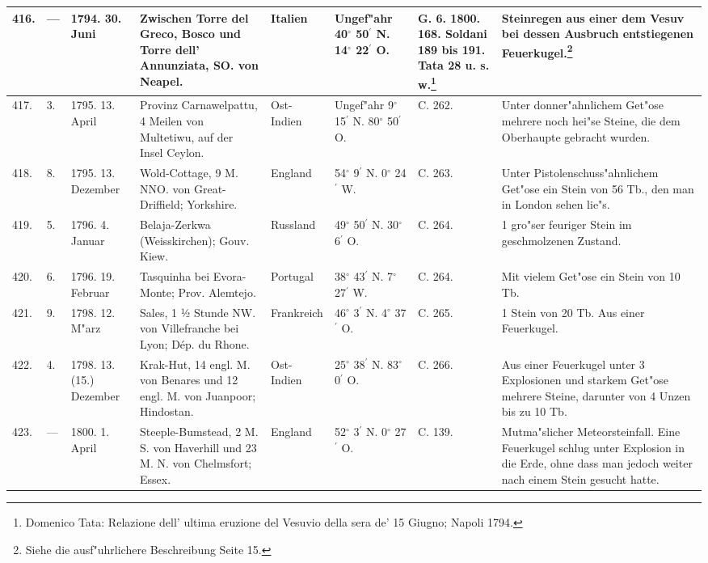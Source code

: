 \documentclass[a4paper, 8pt, oneside, polutonikogreek, german]{article}
\begin{document}
\begin{center}
\begin{longtable}{| p{4mm} | p{2mm} | p{15mm} | p{25mm} | p{16mm} | p{12mm} | p{13mm} | p{20mm} |}
        416. & --- & 1794. 30. Juni & Zwischen Torre del Greco, Bosco und Torre dell’ Annunziata, SO. von Neapel. & Italien & Ungef"ahr 40$^\circ$ 50$^\prime$ N. 14$^\circ$ 22$^\prime$ O. & G. 6. 1800. 168. Soldani 189 bis 191. Tata 28 u. s. w.\footnote{Domenico Tata: Relazione dell' ultima eruzione del Vesuvio della sera de' 15 Giugno; Napoli 1794.} & Steinregen aus einer dem Vesuv bei dessen Ausbruch entstiegenen Feuerkugel.\footnote{Siehe die ausf"uhrlichere Beschreibung Seite 15.} \\ \hline
        417. & 3. & 1795. 13. April & Provinz Carnawelpattu, 4 Meilen von Multetiwu, auf der Insel Ceylon. & Ost-Indien & Ungef"ahr 9$^\circ$ 15$^\prime$ N. 80$^\circ$ 50$^\prime$ O. & C. 262. & Unter donner"ahnlichem Get"ose mehrere noch hei"se Steine, die dem Oberhaupte gebracht wurden. \\ \hline
        418. & 8. & 1795. 13. Dezember & Wold-Cottage, 9 M. NNO. von Great-Driffield; Yorkshire. & England & 54$^\circ$ 9$^\prime$ N. 0$^\circ$ 24$^\prime$ W. & C. 263. & Unter Pistolenschuss"ahnlichem Get"ose ein Stein von 56 Tb., den man in London sehen lie"s. \\ \hline
        419. & 5. & 1796. 4. Januar & Belaja-Zerkwa (Weisskirchen); Gouv. Kiew. & Russland & 49$^\circ$ 50$^\prime$ N. 30$^\circ$ 6$^\prime$ O. & C. 264. & 1 gro"ser feuriger Stein im geschmolzenen Zustand. \\ \hline
        420. & 6. & 1796. 19. Februar & Tasquinha bei Evora-Monte; Prov. Alemtejo. & Portugal & 38$^\circ$ 43$^\prime$ N. 7$^\circ$ 27$^\prime$ W. & C. 264. & Mit vielem Get"ose ein Stein von 10 Tb. \\ \hline
        421. & 9. & 1798. 12. M"arz & Sales, 1 ½ Stunde NW. von Villefranche bei Lyon; Dép. du Rhone. & Frankreich & 46$^\circ$ 3$^\prime$ N. 4$^\circ$ 37$^\prime$ O. & C. 265. & 1 Stein von 20 Tb. Aus einer Feuerkugel. \\ \hline
        422. & 4. & 1798. 13. (15.) Dezember & Krak-Hut, 14 engl. M. von Benares und 12 engl. M. von Juanpoor; Hindostan. & Ost-Indien & 25$^\circ$ 38$^\prime$ N. 83$^\circ$ 0$^\prime$ O. & C. 266. & Aus einer Feuerkugel unter 3 Explosionen und starkem Get"ose mehrere Steine, darunter von 4 Unzen bis zu 10 Tb. \\ \hline
        423. & --- & 1800. 1. April & Steeple-Bumstead, 2 M. S. von Haverhill und 23 M. N. von Chelmsfort; Essex. & England & 52$^\circ$ 3$^\prime$ N. 0$^\circ$ 27$^\prime$ O. & C. 139. & Mutma"slicher Meteorsteinfall. Eine Feuerkugel schlug unter Explosion in die Erde, ohne dass man jedoch weiter nach einem Stein gesucht hatte. \\ \hline

\end{longtable}
\end{center}
\end{document}
